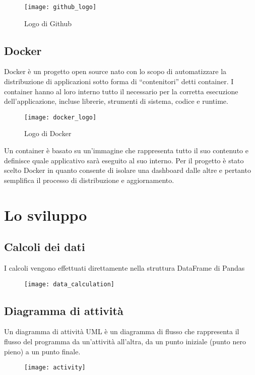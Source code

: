 \begin{figure}[htp]
    \centering
    \texttt{[image: github\_logo]}
    \caption{Logo di Github}
\end{figure}

\subsection{Docker}
\noindent Docker è un progetto open source nato con lo scopo di automatizzare la distribuzione di applicazioni sotto forma di “contenitori” detti container.
I container hanno al loro interno tutto il necessario per la corretta esecuzione dell’applicazione, incluse librerie, strumenti di sistema, codice e runtime.

\begin{figure}[htp]
    \centering
    \texttt{[image: docker\_logo]}
    \caption{Logo di Docker}
\end{figure}

\noindent Un container è basato su un’immagine che rappresenta tutto il suo contenuto e definisce quale applicativo sarà eseguito al suo interno. 
Per il progetto è stato scelto Docker in quanto consente di isolare una dashboard dalle altre e pertanto semplifica il processo di distribuzione e aggiornamento.

\section{Lo sviluppo}

\subsection{Calcoli dei dati}
I calcoli vengono effettuati direttamente nella struttura DataFrame di Pandas
\begin{figure}[htp]
    \centering
    \texttt{[image: data\_calculation]}
\end{figure}


\subsection{Diagramma di attività}
Un diagramma di attività UML è un diagramma di flusso che rappresenta il flusso del programma da un'attività all'altra,
da un punto iniziale (punto nero pieno) a un punto finale.

\begin{figure}[htp]
    \centering
    \texttt{[image: activity]}
\end{figure}

